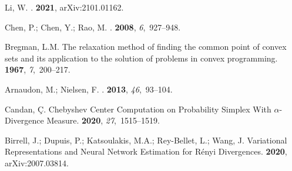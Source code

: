 \documentclass[entropy,article,accept,oneauthor,pdftex,entropy]{Definitions/mdpi}
\begin{document}
\begin{thebibliography}{999}
Li, W.
.
 {\bf 2021}, arXiv:2101.01162.

Chen, P.; Chen, Y.; Rao, M.
.
 {\bf 2008}, {\em
  6},~927--948.

Bregman, L.M.
\newblock The relaxation method of finding the common point of convex sets and
  its application to the solution of problems in convex programming.
 {\bf
  1967}, {\em 7},~200--217.

Arnaudon, M.; Nielsen, F.
.
 {\bf 2013}, {\em 46},~93--104.

Candan, {\c{C}}.
\newblock Chebyshev Center Computation on Probability Simplex With
  $\alpha$-Divergence Measure.
 {\bf 2020}, {\em
  27},~1515--1519.

Birrell, J.; Dupuis, P.; Katsoulakis, M.A.; Rey-Bellet, L.; Wang, J.
\newblock Variational Representations and Neural Network Estimation for
  R{\'e}nyi Divergences.
 {\bf 2020}, arXiv:2007.03814.

\end{thebibliography}
\end{document}
